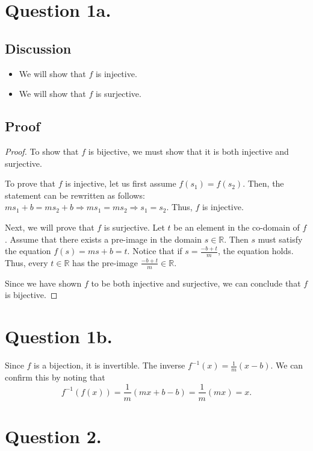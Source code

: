 \documentclass{article}
\begin{document}
\section*{Question 1a.}
\subsection*{Discussion}
\begin{itemize}
    \item We will show that $ f $ is injective.
    \item We will show that $ f $ is surjective.
\end{itemize}

\subsection*{Proof}
\begin{proof}
    To show that $ f $ is bijective, we must show that it is both injective and surjective.

    \noindent To prove that $ f $ is injective, let us first assume $ f(s_1) = f(s_2) $. Then, the statement can be rewritten as follows: $ ms_1 + b = ms_2 + b \Rightarrow ms_1 = ms_2 \Rightarrow s_1 = s_2 $.
    Thus, $ f $ is injective.

    \noindent Next, we will prove that $ f $ is surjective. Let $ t $ be an element in the co-domain of $ f $. Assume that there exists a pre-image in the domain $ s \in \mathbb{R} $. Then $ s $ must satisfy the equation
    $ f(s) = ms + b = t $. Notice that if $ s = \frac{-b + t}{m} $, the equation holds. Thus, every $ t \in \mathbb{R} $ has the pre-image $ \frac{-b + t}{m} \in \mathbb{R} $.

    \noindent Since we have shown $ f $ to be both injective and surjective, we can conclude that $ f $ is bijective.
\end{proof}

\section*{Question 1b.}
\noindent Since $ f $ is a bijection, it is invertible. The inverse $ f^{-1}(x) = \frac{1}{m}(x - b) $. We can confirm this by noting that
\[
    f^{-1}(f(x)) = \frac{1}{m}(mx + b - b) = \frac{1}{m}(mx) = x.
\]

\section*{Question 2.}
\end{document}
